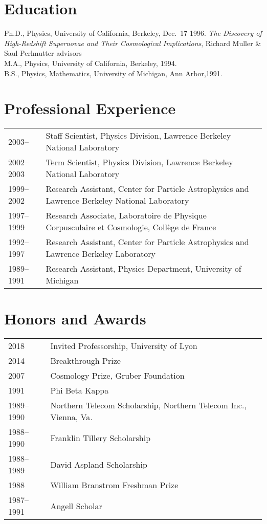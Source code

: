 \documentclass[line, margin]{res}
\begin{document}
\address{Lawrence Berkeley National Laboratory\\
1 Cyclotron Rd, MS: 50R6048\\
Berkeley, CA 94720-8164\\
agkim@lbl.gov
}
\begin{resume}

\section{Education}
Ph.D., Physics, University of California, Berkeley, Dec.\ 17 1996. {\it The Discovery of High-Redshift Supernovae and Their Cosmological Implications},
Richard Muller \& Saul Perlmutter advisors\\
M.A., Physics, University of California, Berkeley, 1994.\\
B.S., Physics, Mathematics, University of Michigan, Ann Arbor,1991.

\section{Professional Experience}
\begin{tabular}{lp{4.4in}}
2003-- & Staff Scientist, Physics Division,
Lawrence Berkeley National Laboratory\\
2002--2003 & Term Scientist, Physics Division,
Lawrence Berkeley National Laboratory\\
1999--2002 & Research Assistant, Center for Particle Astrophysics and Lawrence Berkeley National Laboratory\\
1997--1999& Research Associate, Laboratoire de Physique Corpusculaire et Cosmologie,
Coll{\`e}ge de France\\
1992--1997 & Research Assistant, Center for Particle Astrophysics and Lawrence Berkeley Laboratory\\
1989--1991 & Research Assistant, Physics Department, University of Michigan\\
\end{tabular}

\section{Honors and Awards}
\begin{tabular}{ll}
2018 & Invited Professorship, University of Lyon\\
2014 & Breakthrough Prize\\
2007 & Cosmology Prize, Gruber Foundation\\
1991 & Phi Beta Kappa\\
1989--1990 & Northern Telecom Scholarship, Northern Telecom Inc., Vienna, Va.\\
1988--1990 & Franklin Tillery Scholarship\\
1988--1989 &  David Aspland Scholarship\\
1988 & William Branstrom Freshman Prize\\
1987--1991 & Angell Scholar\\
\end{tabular}


\end{resume}
\end{document}
